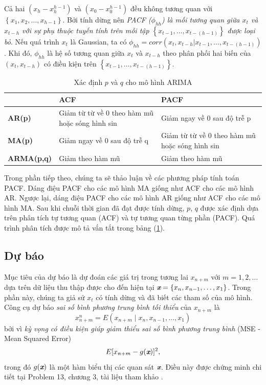 \documentclass[12pt, a4paper,oneside]{book}
\theoremstyle{definition}
\begin{document}
Cả hai $(x_h-x_h^{h-1})$ và $(x_0-x_0^{h-1})$ đều không tương quan với $\left\lbrace x_1, x_2, \dots, x_{h-1}\right\rbrace$. Bởi tính dừng nên \textit{PACF ($\phi_{hh}$) là mối tương quan giữa $x_t$ và $x_{t-h}$ với sự phụ thuộc tuyến tính trên mỗi tập $\left\lbrace x_{t-1},\dots, x_{t-(h-1)}\right\rbrace$ được loại bỏ}. Nếu quá trình $x_t$ là Gaussian, ta có $\phi_{hh}=corr(x_t, x_{t-h}| x_{t-1}, \dots, x_{t-(h-1)})$. Khi đó, $\phi_{hh}$ là hệ số tương quan giữa $x_t$ và $x_{t-h}$ theo phân phối hai biến của $(x_t,x_{t-h})$ có điều kiện trên $\left\lbrace x_{t-1}, \dots, x_{t-(h-1)}\right\rbrace$.
\begin{table}[h!]
	\centering
	\caption{Xác định $p$ và $q$ cho mô hình ARIMA}
	\begin{tabular}{|p{2.5cm}|p{6cm}|p{6cm}|}
		\hline 
		&\textbf{ACF }&\textbf{PACF }\\
		\hline
		\textbf{AR(p)} &Giảm từ từ về 0 theo hàm mũ hoặc sóng hình sin & Giảm ngay về 0 sau độ trễ p\\
		\hline
		\textbf{MA(p)} &Giảm ngay về 0 sau độ trễ q &Giảm từ từ về 0 theo hàm mũ hoặc sóng hình sin \\
		\hline
		\textbf{ARMA(p,q)} &Giảm theo hàm mũ &Giảm theo hàm mũ \\
		\hline
	\end{tabular}
	\label{x1} 
\end{table}

Trong phần tiếp theo, chúng ta sẽ thảo luận về các phương pháp tính toán PACF. Dáng điệu PACF cho các mô hình MA giống như ACF cho các mô hình AR. Ngược lại, dáng điệu PACF cho các mô hình AR giống như ACF cho các mô hình MA. Sau khi chuỗi thời gian đã đạt được tính dừng, $p$, $q$ được xác định dựa trên phân tích tự tương quan (ACF) và tự tương quan từng phần (PACF). Quá trình phân tích được mô tả vắn tắt trong bảng (\ref{x1}).

\subsection{\label{db}Dự báo}
Mục tiêu của dự báo là dự đoán các giá trị trong tương lai $x_{n+m}$ với $m =1, 2,\dots$ dựa trên dữ liệu thu thập được cho đến hiện tại $\textit{\textbf{x}} = \left\lbrace x_{n}, x_{n-1},\dots, x_{1}\right\rbrace$. Trong phần này, chúng ta giả sử $x_t$ có tính dừng và đã biết các tham số của mô hình. Công cụ dự báo \textit{sai số bình phương trung bình tối thiểu} của $x_{n+m}$ là 
$$x_{n+m}^n= E(x_{n+m}\mid x_{n}, x_{n-1}, \dots, x_{1})$$ bởi vì \textit{kỳ vọng có điều kiện giúp giảm thiểu sai số bình phương trung bình} (MSE - Mean Squared Error)
\begin{equation}
E[x_{n+m} - g(\textit{\textbf{x}})]^2, \label{ct1.133}
\end{equation}
trong đó $g(\textit{\textbf{x}})$ là một hàm biểu thị các quan sát $\textit{\textbf{x}}$. Điều này được chứng minh chi tiết tại Problem 13, chương 3, tài liệu tham khảo \cite{1}.
\end{document}
